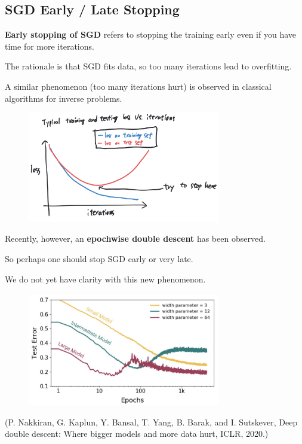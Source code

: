 \documentclass{report}
\begin{document}
\subsection{SGD Early / Late Stopping}

\begin{definition}
    \textbf{Early stopping of SGD} refers to stopping the training early even if you have time for more iterations.

    The rationale is that SGD fits data, so too many iterations lead to overfitting.

    A similar phenomenon (too many iterations hurt) is observed in classical algorithms for inverse problems.

    \begin{figure}[H]
        \centering
        \includegraphics[width=0.75\textwidth]{.././assets/6.7.png}
    \end{figure}
\end{definition}

\begin{definition}
    Recently, however, an \textbf{epochwise double descent} has been observed.

    So perhaps one should stop SGD early or very late.

    We do not yet have clarity with this new phenomenon.

    \begin{figure}[H]
        \centering
        \includegraphics[width=0.75\textwidth]{.././assets/6.8.jpg}
    \end{figure}

    (P. Nakkiran, G. Kaplun, Y. Bansal, T. Yang, B. Barak, and I. Sutskever, Deep double descent: Where bigger models and more data hurt, ICLR, 2020.)
\end{definition}
\end{document}
